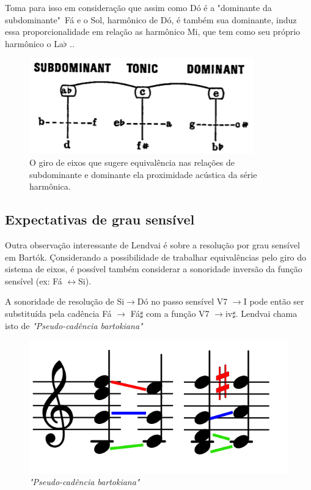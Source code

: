 \documentclass[
	12pt,				%
	openright,			%
	twoside,			%
	a4paper,			%
	english,			%
	french,				%
	spanish,			%
	brazil				%
	]{abntex2}
\begin{document}
Toma para isso em consideração que assim como Dó é a "dominante da subdominante"\ Fá e o Sol, harmônico de Dó, é também sua dominante, induz essa proporcionalidade em relação as harmônico Mi, que tem como seu próprio harmônico o La$\flat$ .\cite[ p.11]{lendvai1971bela}.

\begin{figure}[!h]
	\caption{\label{fig_grafico}O giro de eixos que sugere equivalência nas relações de subdominante e dominante ela proximidade acústica da série harmônica. }
	\begin{center}
	    \includegraphics[scale=0.5]{axis/giro_de_eixos.png}
	\end{center}
\end{figure}



\subsection{Expectativas de grau sensível}

Outra observação interessante de Lendvai é sobre a resolução por grau sensível em Bartók. Çonsiderando a possibilidade de trabalhar equivalências pelo giro do sistema de eixos, é possível também considerar a sonoridade inversão da função sensível (ex: Fá $\leftrightarrow$Si).

A sonoridade de resolução de Si$\rightarrow$Dó no passo sensível V7 $\rightarrow$I pode então ser substituída pela cadência Fá  $\rightarrow$ Fá$\sharp$ com a função  V7 $\rightarrow$iv$\sharp$. Lendvai chama isto de \textit{"Pseudo-cadência bartokiana"}\cite[ p.13]{lendvai1971bela}

\begin{figure}[!h]
	\caption{\label{fig_grafico}\textit{"Pseudo-cadência bartokiana"} }
	\begin{center}
	    \includegraphics[scale=0.4]{axis/resolve.png}
	\end{center}
\end{figure}
\end{document}
